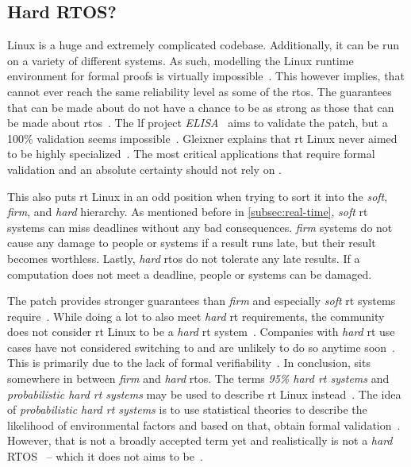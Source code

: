 \documentclass[10pt,twocolumn,a4paper]{article}
\begin{document}
\subsection{Hard RTOS?}
Linux is a huge and extremely complicated codebase.
Additionally, it can be run on a variety of different systems.
As such, modelling the Linux runtime environment for formal proofs is virtually impossible~\cite{reghenzani_realtime_2019}.
This however implies, that  cannot ever reach the same reliability level as some of the \acrshort{rtos}.
The guarantees that can be made about  do not have a chance to be as strong as those that can be made about \acrshort{rtos}~\cite{reghenzani_realtime_2019}.
The \acrfull{lf} project \emph{ELISA}~\cite{elisa_2025} aims to validate the patch, but a 100\% validation seems impossible~\cite{perlow_trenches_2021}.
Gleixner explains that \acrshort{rt} Linux never aimed to be highly specialized~\cite{perlow_trenches_2021}.
The most critical applications that require formal validation and an absolute certainty should not rely on .

This also puts \acrshort{rt} Linux in an odd position when trying to sort it into the \emph{soft}, \emph{firm}, and \emph{hard} hierarchy.
As mentioned before in \autoref{subsec:real-time}, \emph{soft} \acrshort{rt} systems can miss deadlines without any bad consequences.
\emph{firm} systems do not cause any damage to people or systems if a result runs late, but their result becomes worthless.
Lastly, \emph{hard} \acrshort{rtos} do not tolerate any late results.
If a computation does not meet a deadline, people or systems can be damaged.

The  patch provides stronger guarantees than \emph{firm} and especially \emph{soft} \acrshort{rt} systems require~\cite{reghenzani_realtime_2019}.
While doing a lot to also meet \emph{hard} \acrshort{rt} requirements, the community does not consider \acrshort{rt} Linux to be a \emph{hard} \acrshort{rt} system~\cite{barbieri_rt-linux_rtos}.
Companies with \emph{hard} \acrshort{rt} use cases have not considered switching to  and are unlikely to do so anytime soon~\cite{reghenzani_realtime_2019}.
This is primarily due to the lack of formal verifiability~\cite{reghenzani_realtime_2019}.
In conclusion,  sits somewhere in between \emph{firm} and \emph{hard} \acrshort{rtos}.
The terms \emph{95\% hard \acrshort{rt} systems} and \emph{probabilistic hard \acrshort{rt} systems} may be used to describe \acrshort{rt} Linux instead~\cite{reghenzani_realtime_2019}.
The idea of \emph{probabilistic hard \acrshort{rt} systems} is to use statistical theories to describe the likelihood of environmental factors and based on that, obtain formal validation~\cite{reghenzani_realtime_2019}.
However, that is not a broadly accepted term yet and realistically  is not a \emph{hard} RTOS~\cite{reghenzani_realtime_2019} -- which it does not aims to be~\cite{perlow_trenches_2021}.
\end{document}
